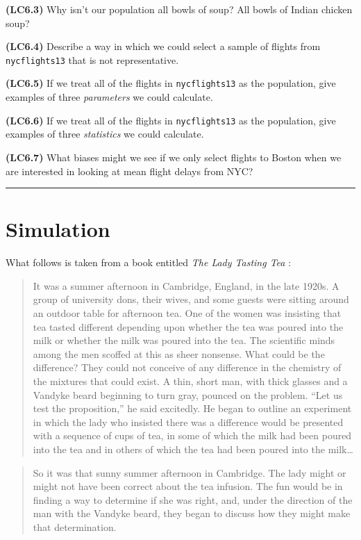 \documentclass[]{tufte-book}
\let\oldrule=\rule
\renewcommand{\rule}[1]{\oldrule{\linewidth}}
\begin{document}
\textbf{(LC6.3)} Why isn't our population all bowls of soup? All bowls
of Indian chicken soup?

\textbf{(LC6.4)} Describe a way in which we could select a sample of
flights from \texttt{nycflights13} that is not representative.

\textbf{(LC6.5)} If we treat all of the flights in \texttt{nycflights13}
as the population, give examples of three \emph{parameters} we could
calculate.

\textbf{(LC6.6)} If we treat all of the flights in \texttt{nycflights13}
as the population, give examples of three \emph{statistics} we could
calculate.

\textbf{(LC6.7)} What biases might we see if we only select flights to
Boston when we are interested in looking at mean flight delays from NYC?

\begin{center}\rule{0.5\linewidth}{\linethickness}\end{center}

\section{Simulation}\label{simulation}

What follows is taken from a book entitled \emph{The Lady Tasting Tea}
\citep{salsburg2001}:

\begin{quote}
It was a summer afternoon in Cambridge, England, in the late 1920s. A
group of university dons, their wives, and some guests were sitting
around an outdoor table for afternoon tea. One of the women was
insisting that tea tasted different depending upon whether the tea was
poured into the milk or whether the milk was poured into the tea. The
scientific minds among the men scoffed at this as sheer nonsense. What
could be the difference? They could not conceive of any difference in
the chemistry of the mixtures that could exist. A thin, short man, with
thick glasses and a Vandyke beard beginning to turn gray, pounced on the
problem. ``Let us test the proposition,'' he said excitedly. He began to
outline an experiment in which the lady who insisted there was a
difference would be presented with a sequence of cups of tea, in some of
which the milk had been poured into the tea and in others of which the
tea had been poured into the milk\ldots{}
\end{quote}

\begin{quote}
So it was that sunny summer afternoon in Cambridge. The lady might or
might not have been correct about the tea infusion. The fun would be in
finding a way to determine if she was right, and, under the direction of
the man with the Vandyke beard, they began to discuss how they might
make that determination.
\end{quote}
\end{document}
